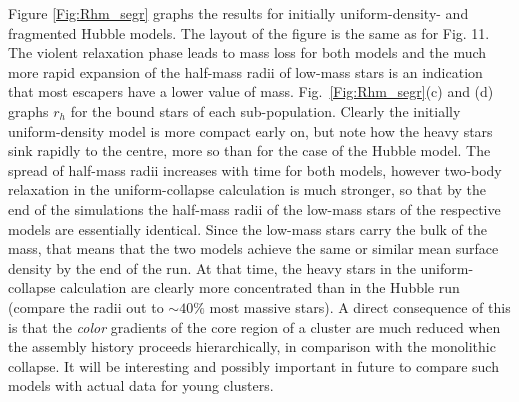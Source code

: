 %

Figure \ref{Fig:Rhm_segr} graphs the results for initially uniform-density- and fragmented Hubble models. The layout of the figure is the same as for Fig. 11. The violent relaxation phase leads to mass loss for both models and the much more rapid expansion of the half-mass radii of low-mass stars is an indication that most escapers have a lower value of mass. Fig.~\ref{Fig:Rhm_segr}(c) and (d) graphs $r_h$ for the bound stars of each sub-population. Clearly the initially uniform-density model is more compact early on, but note how the heavy stars sink rapidly to the centre, more so than for the case of the Hubble model. The spread of half-mass radii increases with time for both models, however two-body relaxation in the uniform-collapse calculation is much stronger, so that by the end of the simulations the half-mass radii of the low-mass stars of the respective models are essentially identical. Since the low-mass stars carry the bulk of the mass, that means that the two models achieve the same or similar mean surface density by the end of the run. At that time, the heavy stars in the uniform-collapse calculation are clearly more concentrated than in the Hubble run (compare the radii out to $\sim 40\%$ most massive stars). A direct consequence of this is that the {\it color} gradients of the core region of a cluster are much reduced when the assembly history proceeds hierarchically, in comparison with the monolithic collapse. It will be interesting and possibly important in future to compare such models with actual data for young clusters.

